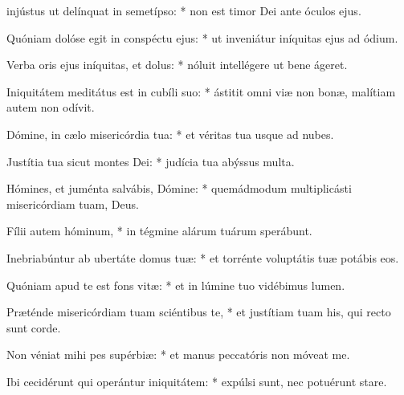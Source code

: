 \begin{psalmus}
    
     injústus ut delínquat in semetípso: * non est timor Dei ante óculos ejus.
		
		Quóniam dolóse egit in conspéctu ejus: * ut inveniátur iníquitas ejus ad ódium.
		
		Verba oris ejus iníquitas, et dolus: * nóluit intellégere ut bene ágeret.
		
		Iniquitátem meditátus est in cubíli suo: * ástitit omni viæ non bonæ, malítiam autem non odívit.
		
		Dómine, in cælo misericórdia tua: * et véritas tua usque ad nubes.
		
		Justítia tua sicut montes Dei: * judícia tua abýssus multa.
		
		Hómines, et juménta salvábis, Dómine: * quemádmodum multiplicásti misericórdiam tuam, Deus.
		
		Fílii autem hóminum, * in tégmine alárum tuárum sperábunt.
		
		Inebriabúntur ab ubertáte domus tuæ: * et torrénte voluptátis tuæ potábis eos.
		
		Quóniam apud te est fons vitæ: * et in lúmine tuo vidébimus lumen.
		
		Præténde misericórdiam tuam sciéntibus te, * et justítiam tuam his, qui recto sunt corde.
		
		Non véniat mihi pes supérbiæ: * et manus peccatóris non móveat me.
		
		Ibi cecidérunt qui operántur iniquitátem: * expúlsi sunt, nec potuérunt stare.

\end{psalmus}
